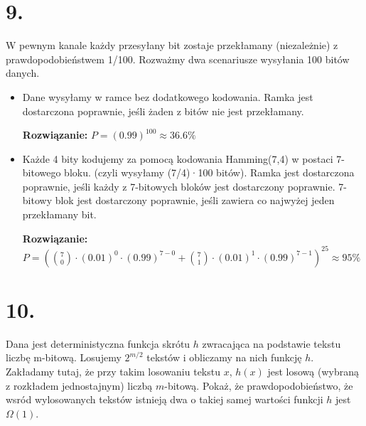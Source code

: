 \documentclass{article}
\begin{document}
\section*{9.}
W pewnym kanale każdy przesyłany bit zostaje przekłamany (niezależnie) z prawdopodobieństwem
1/100. Rozważmy dwa scenariusze wysyłania 100 bitów danych.
\begin{itemize}
    \item Dane wysyłamy w ramce bez dodatkowego kodowania. Ramka jest dostarczona poprawnie, jeśli żaden z bitów nie jest przekłamany.
    
    \textbf{Rozwiązanie:} $P = (0.99)^{100} \approx 36.6\%$
    \item Każde 4 bity kodujemy za pomocą kodowania Hamming(7,4) w postaci 7-bitowego bloku. (czyli wysyłamy (7/4)·100 bitów). Ramka jest dostarczona poprawnie, jeśli każdy z 7-bitowych bloków jest dostarczony poprawnie. 7-bitowy blok jest dostarczony poprawnie, jeśli zawiera co najwyżej jeden przekłamany bit.
    
    \textbf{Rozwiązanie:} $P = (\binom{7}{0}\cdot(0.01)^0\cdot (0.99)^{7-0} + \binom{7}{1}\cdot (0.01)^1 \cdot (0.99)^{7-1})^{25} \approx 95\%$
\end{itemize}

\section*{10.}
Dana jest deterministyczna funkcja skrótu $h$ zwracająca na podstawie tekstu liczbę m-bitową. Losujemy $2^{m/2}$ tekstów i obliczamy na nich funkcję $h$. Zakładamy tutaj, że przy takim losowaniu tekstu $x$,
$h(x)$ jest losową (wybraną z rozkładem jednostajnym) liczbą $m$-bitową. Pokaż, że prawdopodobieństwo, że wsród wylosowanych tekstów istnieją dwa o takiej samej wartości funkcji $h$ jest $\Omega(1)$.
\end{document}
